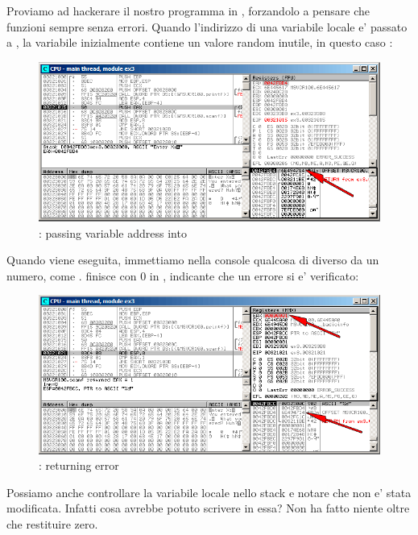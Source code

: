 \clearpage
{}

Proviamo ad hackerare il nostro programma in \olly, forzandolo a pensare che \scanf funzioni sempre senza errori.
Quando l'indirizzo di una variabile locale e' passato a \scanf, la variabile inizialmente contiene un valore random inutile, in questo caso :

\begin{figure}[H]
\centering
\includegraphics[scale=\FigScale]{patterns/04_scanf/3_checking_retval/olly_1.png}
\caption{\olly: passing variable address into \scanf}
\label{fig:scanf_ex3_olly_1}
\end{figure}

\clearpage
Quando \scanf viene eseguita, immettiamo nella console qualcosa di diverso da un numero, come .
\scanf finisce con 0 in \EAX, indicante che un errore si e' verificato:

\begin{figure}[H]
\centering
\includegraphics[scale=\FigScale]{patterns/04_scanf/3_checking_retval/olly_2.png}
\caption{\olly: \scanf returning error}
\label{fig:scanf_ex3_olly_2}
\end{figure}

Possiamo anche controllare la variabile locale nello stack e notare che non e' stata modificata.
Infatti cosa avrebbe potuto scrivere \scanf in essa? Non ha fatto niente oltre che restituire zero. 


